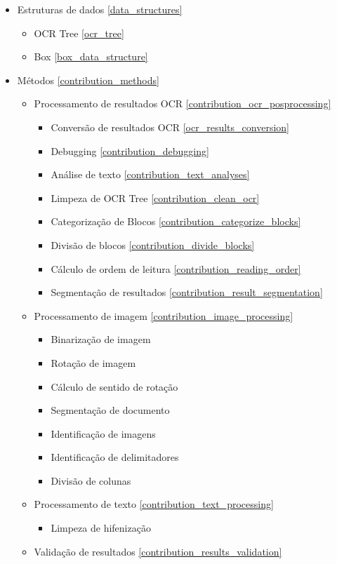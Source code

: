 \begin{itemize}\setlength\itemsep{-0.3em}
	\item Estruturas de dados \ref{data_structures}
	\begin{itemize}\setlength\itemsep{-0.3em}
		\item OCR Tree \ref{ocr_tree}
		\item Box \ref{box_data_structure}
	\end{itemize}
	\item Métodos \ref{contribution_methods}
	
	\begin{itemize}\setlength\itemsep{-0.3em}
		\item Processamento de resultados OCR \ref{contribution_ocr_posprocessing}
		
		\begin{itemize}\setlength\itemsep{-0.3em}
			\item Conversão de resultados OCR \ref{ocr_results_conversion}
			\item Debugging \ref{contribution_debugging}
			\item Análise de texto \ref{contribution_text_analyses}
			\item Limpeza de OCR Tree \ref{contribution_clean_ocr}
			\item Categorização de Blocos \ref{contribution_categorize_blocks}
			\item Divisão de blocos \ref{contribution_divide_blocks}
			\item Cálculo de ordem de leitura \ref{contribution_reading_order}
			\item Segmentação de resultados \ref{contribution_result_segmentation}
		\end{itemize}
		
		\item Processamento de imagem \ref{contribution_image_processing}
		\begin{itemize}\setlength\itemsep{-0.3em}
			\item Binarização de imagem
			\item Rotação de imagem
			\item Cálculo de sentido de rotação
			\item Segmentação de documento
			\item Identificação de imagens
			\item Identificação de delimitadores
			\item Divisão de colunas 
		\end{itemize}
		
		\item Processamento de texto \ref{contribution_text_processing}
		\begin{itemize}\setlength\itemsep{-0.3em}
			\item Limpeza de hifenização
		\end{itemize}
		
	
	
		\item Validação de resultados \ref{contribution_results_validation}
	\end{itemize}
\end{itemize}


